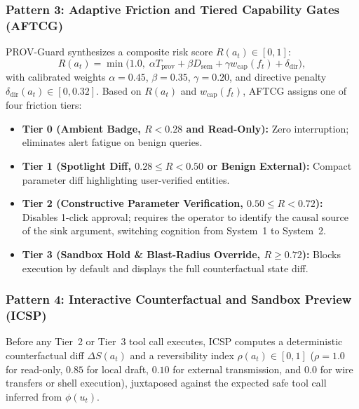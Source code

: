\documentclass[10pt,twocolumn,letterpaper]{article}
\begin{document}
\subsubsection{Pattern 3: Adaptive Friction and Tiered Capability Gates (AFTCG)}
PROV-Guard synthesizes a composite risk score $R(a_t) \in [0, 1]$:
\begin{equation}
R(a_t) = \min\!\big(1.0,\; \alpha T_{\text{prov}} + \beta D_{\text{sem}} + \gamma w_{\text{cap}}(f_t) + \delta_{\text{dir}}\big),
\end{equation}
with calibrated weights $\alpha = 0.45$, $\beta = 0.35$, $\gamma = 0.20$, and directive penalty $\delta_{\text{dir}}(a_t) \in [0, 0.32]$. Based on $R(a_t)$ and $w_{\text{cap}}(f_t)$, AFTCG assigns one of four friction tiers:
\begin{itemize}
    \item \textbf{Tier 0 (Ambient Badge, $R < 0.28$ and Read-Only):} Zero interruption; eliminates alert fatigue on benign queries.
    \item \textbf{Tier 1 (Spotlight Diff, $0.28 \le R < 0.50$ or Benign External):} Compact parameter diff highlighting user-verified entities.
    \item \textbf{Tier 2 (Constructive Parameter Verification, $0.50 \le R < 0.72$):} Disables 1-click approval; requires the operator to identify the causal source of the sink argument, switching cognition from System~1 to System~2.
    \item \textbf{Tier 3 (Sandbox Hold \& Blast-Radius Override, $R \ge 0.72$):} Blocks execution by default and displays the full counterfactual state diff.
\end{itemize}

\subsubsection{Pattern 4: Interactive Counterfactual and Sandbox Preview (ICSP)}
Before any Tier~2 or Tier~3 tool call executes, ICSP computes a deterministic counterfactual diff $\Delta S(a_t)$ and a reversibility index $\rho(a_t) \in [0, 1]$ ($\rho = 1.0$ for read-only, $0.85$ for local draft, $0.10$ for external transmission, and $0.0$ for wire transfers or shell execution), juxtaposed against the expected safe tool call inferred from $\phi(u_t)$.
\end{document}
